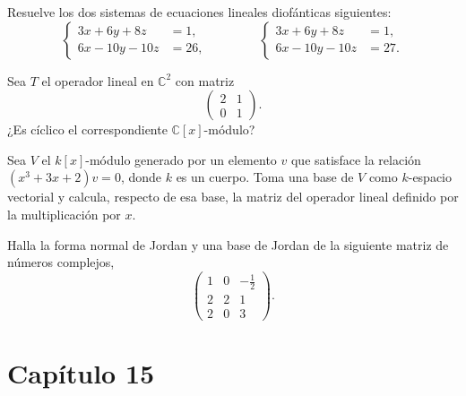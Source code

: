 \documentclass[12pt]{article}
\begin{document}
    
    \begin{exercise}
        Resuelve los dos sistemas de ecuaciones lineales diofánticas siguientes:
        \[
            \left\{
            \begin{aligned}
                3x+6y+8z&=1,\\
                6x-10y-10z&=26,
            \end{aligned}
            \right.
            \qquad\qquad
            \left\{
            \begin{aligned}
                3x+6y+8z&=1,\\
                6x-10y-10z&=27.
            \end{aligned}
            \right.
        \]
    \end{exercise}

    \begin{exercise}[14.8.1]
        Sea $T$ el operador lineal en $\mathbb{C}^2$ con matriz
        \[\left(\begin{array}{cc}
            2&1\\0&1
        \end{array}\right).\]
        ¿Es cíclico el correspondiente $\mathbb{C}[x]$-módulo?
    \end{exercise}

    \begin{exercise}[14.8.3]
        Sea $V$ el $k[x]$-módulo generado por un elemento $v$ que satisface la relación $(x^3+3x+2)v=0$, donde $k$ es un cuerpo. Toma una base de $V$ como $k$-espacio vectorial y calcula, respecto de esa base, la matriz del operador lineal definido por la multiplicación por $x$.
    \end{exercise}

    \begin{exercise}
        Halla la forma normal de Jordan y una base de Jordan de la siguiente matriz de números complejos, 
        \[\left(\begin{array}{ccr}
            1&0&-\frac{1}{2}\\
            2&2&1\\
            2&0&3
        \end{array}\right).\]
    \end{exercise}
    
    
    
    
    
    
    \section*{Capítulo 15} %
    \label{sec:capitulo_15}
    
\end{document}
